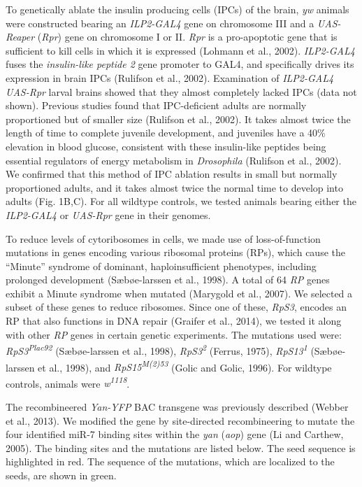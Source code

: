 To genetically ablate the insulin producing cells (IPCs) of the brain, \emph{yw} animals were constructed bearing an \emph{ILP2-GAL4} gene on chromosome III and a \emph{UAS-Reaper} (\emph{Rpr}) gene on chromosome I or II. \emph{Rpr} is a pro-apoptotic gene that is sufficient to kill cells in which it is expressed (Lohmann et al., 2002). \emph{ILP2-GAL4} fuses the \emph{insulin-like peptide 2} gene promoter to GAL4, and specifically drives its expression in brain IPCs (Rulifson et al., 2002). Examination of \emph{ILP2-GAL4 UAS-Rpr} larval brains showed that they almost completely lacked IPCs (data not shown). Previous studies found that IPC-deficient adults are normally proportioned but of smaller size (Rulifson et al., 2002). It takes almost twice the length of time to complete juvenile development, and juveniles have a 40\% elevation in blood glucose, consistent with these insulin-like peptides being essential regulators of energy metabolism in \emph{Drosophila} (Rulifson et al., 2002). We confirmed that this method of IPC ablation results in small but normally proportioned adults, and it takes almost twice the normal time to develop into adults (Fig. 1B,C). For all wildtype controls, we tested animals bearing either the \emph{ILP2-GAL4} or \emph{UAS-Rpr} gene in their genomes.

To reduce levels of cytoribosomes in cells, we made use of loss-of-function mutations in genes encoding various ribosomal proteins (RPs), which cause the ``Minute'' syndrome of dominant, haploinsufficient phenotypes, including prolonged development (Sæbøe-larssen et al., 1998). A total of 64 \emph{RP} genes exhibit a Minute syndrome when mutated (Marygold et al., 2007). We selected a subset of these genes to reduce ribosomes. Since one of these, \emph{RpS3}, encodes an RP that also functions in DNA repair (Graifer et al., 2014), we tested it along with other \emph{RP} genes in certain genetic experiments. The mutations used were: \emph{RpS3\textsuperscript{Plac92}} (Sæbøe-larssen et al., 1998), \emph{RpS3\textsuperscript{2}} (Ferrus, 1975), \emph{RpS13\textsuperscript{1 }}(Sæbøe-larssen et al., 1998), and \emph{RpS15\textsuperscript{M(2)53}} (Golic and Golic, 1996). For wildtype controls, animals were \emph{w\textsuperscript{1118}}.

The recombineered \emph{Yan-YFP} BAC transgene was previously described (Webber et al., 2013). We modified the gene by site-directed recombineering to mutate the four identified miR-7 binding sites within the \emph{yan} (\emph{aop}) gene (Li and Carthew, 2005). The binding sites and the mutations are listed below. The seed sequence is highlighted in red. The sequence of the mutations, which are localized to the seeds, are shown in green.

